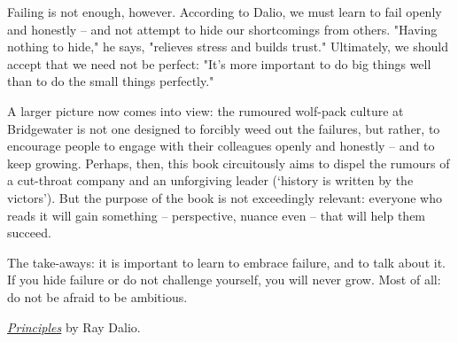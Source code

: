    Failing is not enough, however. According to Dalio, we must learn to
   fail openly and honestly -- and not attempt to hide our shortcomings
   from others. "Having nothing to hide," he says, "relieves stress and
   builds trust." Ultimately, we should accept that we need not be
   perfect: "It's more important to do big things well than to do the
   small things perfectly."

   A larger picture now comes into view: the rumoured wolf-pack culture at
   Bridgewater is not one designed to forcibly weed out the failures, but
   rather, to encourage people to engage with their colleagues openly and
   honestly -- and to keep growing. Perhaps, then, this book circuitously
   aims to dispel the rumours of a cut-throat company and an unforgiving
   leader (`history is written by the victors'). But the purpose of the
   book is not exceedingly relevant: everyone who reads it will gain
   something -- perspective, nuance even -- that will help them succeed.

   The take-aways: it is important to learn to embrace failure, and to
   talk about it. If you hide failure or do not challenge yourself, you
   will never grow. Most of all: do not be afraid to be ambitious.

\textit{\href{https://www.goodreads.com/book/show/34536488-principles}{Principles}} by Ray Dalio.

  
